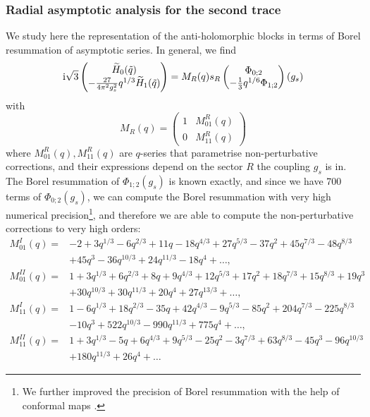 \documentclass[a4paper,11pt]{article}
\theoremstyle{definition}
\newcommand{\ri}{{\rm i}}
\def\tq{{\tilde{q}}}
\newcommand{\wt}[1]{\widetilde{#1}}
\newcommand{\nn}{\nonumber \\}
\begin{document}
\subsubsection{Radial asymptotic analysis for the second trace}
\label{sc:rasym-P2}

We study here the representation of the anti-holomorphic blocks in
terms of Borel resummation of asymptotic series.
In general, we find
\begin{equation}
  \ri\sqrt{3}
  \begin{pmatrix}
    \wt{H}_0(\tq)\\
    -\frac{27}{4\pi^2g_s^2}q^{1/3}\wt{H}_1(\tq)
  \end{pmatrix}
  =
  M_R(q) s_R
  \begin{pmatrix}
    \Phi_{0;2}\\
    -\frac{1}{3}q^{1/6}\Phi_{1;2}
  \end{pmatrix}(g_s)
  \label{eq:rasym-P2}
\end{equation}
with
\begin{equation}
  M_R(q) =   \begin{pmatrix}
    1 & M^{R}_{01}(q)\\
    0 & M^{R}_{11}(q)
  \end{pmatrix}
\end{equation}
%
where $M_{01}^R(q), M_{11}^R(q)$ are $q$-series that parametrise
non-perturbative corrections, and their expressions depend on the
sector $R$ the coupling $g_s$ is in. The Borel resummation of
$\Phi_{1;2}(g_s)$ is known exactly, and since we have 700 terms of
$\Phi_{0;2}(g_s)$, we can compute the Borel resummation with very high
numerical precision\footnote{We further improved the precision of
  Borel resummation with the help of conformal maps
  \cite{Costin:2019xql,Costin:2020hwg}.}, and therefore we are able to
compute the non-perturbative corrections to very high orders:
\begin{subequations}
\label{mP2-qseries}
\begin{align}
  M_{01}^{I}(q) =
  &-2+3q^{1/3}-6q^{2/3}+11q-18q^{4/3}+27q^{5/3}-37q^2
    +45q^{7/3}-48q^{8/3}\nn
  &+45q^{3}-36q^{10/3}+24q^{11/3}-18q^4+\ldots,
  \label{eq:M01I-P2}\\
  M_{01}^{II}(q) =
  &1+3q^{1/3}+6q^{2/3}+8q+9q^{4/3}+12q^{5/3}+17q^{2}
    +18q^{7/3}+15q^{8/3}+19q^{3}\nn
  &+30q^{10/3}+30q^{11/3}+20q^{4} +27q^{13/3}+\ldots,
  \label{eq:M01II-P2}\\
  M_{11}^{I}(q) =
  &1-6q^{1/3}+18q^{2/3}-35q+42q^{4/3}-9q^{5/3}-85q^2
    +204q^{7/3}-225 q^{8/3} \nn
  &- 10 q^3 + 522 q^{10/3}- 990 q^{11/3} + 775 q^4+\ldots,
  \label{eq:M11I-P2}\\
  M_{11}^{II}(q) =
  &1+3q^{1/3}-5q+6q^{4/3}+9q^{5/3}-25q^2-3q^{7/3}+63q^{8/3}
    -45q^3  -96q^{10/3}\nn
  &+180q^{11/3}+26 q^4+\ldots
    \label{eq:M11II-P2}
\end{align}
\end{subequations}
\end{document}
